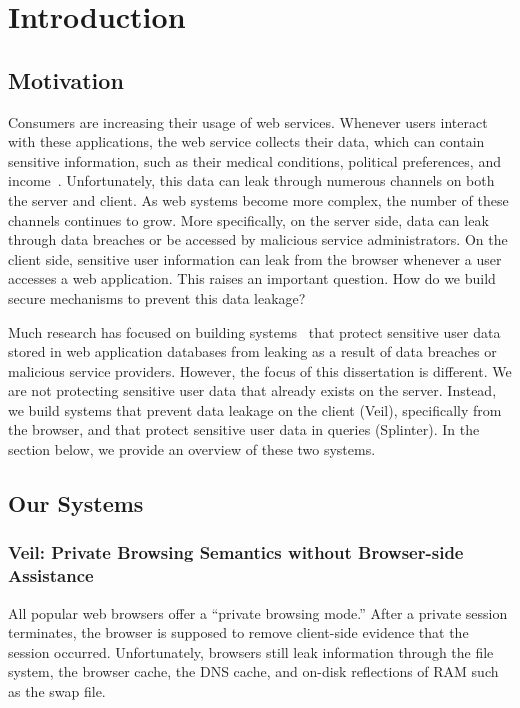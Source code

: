 \section{Introduction}
\label{chap:intro}

\subsection{Motivation}
Consumers are increasing their usage of web services. Whenever
users interact with these applications, the web service collects
their data, which can contain sensitive 
information, such as their medical conditions,
political preferences, and income~\cite{narayanan2010myths, narayanan2008robust}.
Unfortunately, this data can 
leak through numerous channels on both the server
and client. As web systems become more complex, the 
number of these channels continues to grow. More specifically,
on the server side, data can leak through data breaches
or be accessed by malicious service administrators. On the client side,
sensitive user information can leak from the browser whenever
a user accesses a web application. This raises an important
question. How do we build secure
mechanisms to prevent this data leakage?

Much research has focused on building systems~\cite{popa:mylar, popa:cryptdb, li:sundr, feldman:sporc} 
that protect sensitive user data stored in web application databases
from leaking as a result of data breaches or malicious service
providers. However, the focus of
this dissertation is different. We are not protecting sensitive 
user data that already exists on the server.
Instead, we build systems
that prevent data leakage on the client (Veil), specifically
from the browser, and that protect sensitive user data in queries (Splinter).
In the section below, we provide an overview of these two systems.

\subsection{Our Systems}

\subsubsection{Veil: Private Browsing Semantics without Browser-side Assistance}
All popular web browsers offer a ``private browsing
mode.'' After a private session terminates, the
browser is supposed to remove client-side
evidence that the session occurred. Unfortunately,
browsers still leak information through the file
system, the browser cache, the DNS cache, and
on-disk reflections of RAM such as the swap file.

